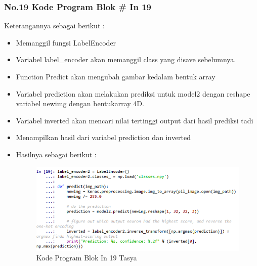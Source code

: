 \subsubsection{No.19 Kode Program Blok \# In 19}

Keterangannya sebagai berikut :\\
\begin{itemize}
\item Memanggil fungsi LabelEncoder
\item Variabel label\_encoder akan memanggil class yang disave sebelumnya.
\item Function Predict akan mengubah gambar kedalam bentuk array
\item Variabel prediction akan melakukan prediksi untuk model2 dengan reshape variabel newimg dengan bentukarray 4D.
\item Variabel inverted akan mencari nilai tertinggi output dari hasil prediksi tadi
\item Menampilkan hasil dari variabel prediction dan inverted
\item Hasilnya sebagai berikut :\\
\begin{figure}[ht]
\centering
\includegraphics[scale=0.5]{figures/Chapter 7/1164086/Praktek/chapter7tasya33.png}
\caption{Kode Program Blok In 19 Tasya}
\label{Praktek}
\end{figure}
\end{itemize}

